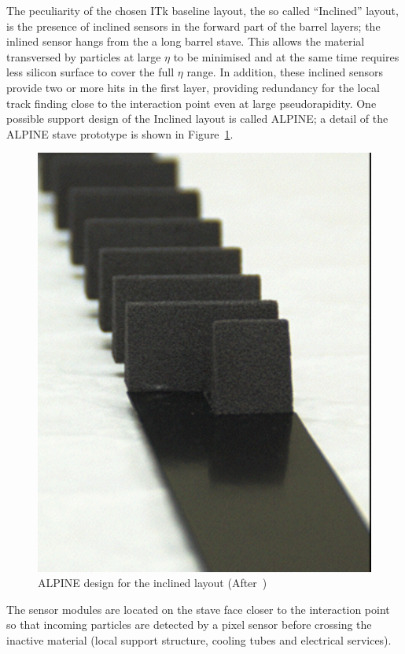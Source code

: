 The peculiarity of the chosen ITk baseline layout, the so called ``Inclined'' layout, is the presence of 
inclined sensors in the forward part of the barrel layers; the inlined sensor hangs from the a long 
barrel stave.
   This allows the material transversed by particles at 
large  $\eta$ to be minimised and at the same time requires less silicon surface to cover the full  $\eta$  
range. In addition, these inclined sensors provide two or more hits in the first layer, providing redundancy for the local track finding close to the interaction point even at large pseudorapidity.
One possible  support design of the Inclined layout is called ALPINE; a detail of the ALPINE stave 
prototype is shown in Figure~\ref{fig:ALPINE}.
\begin{figure}[!htpb]
\centering
\includegraphics[height=0.25\textheight]{ALPINE.pdf}
\caption{\label{fig:ALPINE}ALPINE design for the inclined layout (After~\cite{ITkStripsTDR})}
\end{figure}
The sensor modules are located on the stave face closer to the interaction point so that incoming particles 
are detected by a pixel sensor before crossing the inactive material (local support structure, cooling tubes 
and electrical services).

